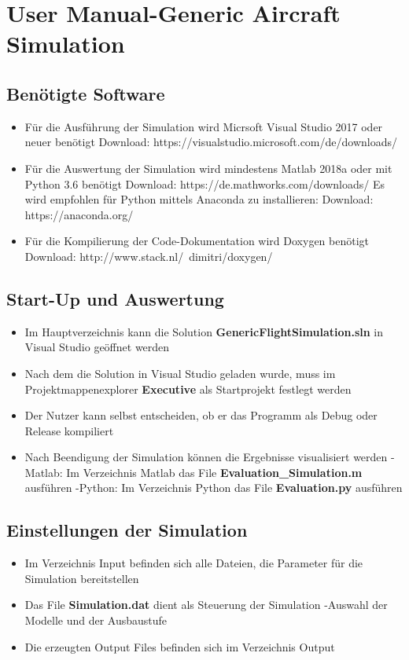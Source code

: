 \documentclass[
11pt,				%
a4paper,			%
DIV12,		     	%
liststotoc,			%
bibliography=totoc, %
listof=entryprefix, %
listot=entryprefix, %
appendixprefix=true,
pointlessnumbers,
	oneside,		%
]{scrbook}
\begin{document}
	
\chapter*{User Manual-Generic Aircraft Simulation}

\section{Benötigte Software}
\begin{itemize}
	\item Für die Ausführung der Simulation wird Micrsoft Visual Studio 2017 oder neuer benötigt
	\subitem Download: https://visualstudio.microsoft.com/de/downloads/
	\item  Für die Auswertung der Simulation wird mindestens Matlab 2018a oder  mit Python 3.6 benötigt
	\subitem Download: https://de.mathworks.com/downloads/
	\subitem Es wird empfohlen für Python mittels Anaconda zu installieren:
	\subitem Download: https://anaconda.org/
	\item Für die Kompilierung der Code-Dokumentation wird Doxygen benötigt
	\subitem Download: http://www.stack.nl/~dimitri/doxygen/
\end{itemize}
\section{Start-Up und Auswertung}
\begin{itemize}
	\item Im Hauptverzeichnis kann die Solution \textbf{GenericFlightSimulation.sln} in Visual Studio geöffnet werden
	\item Nach dem die Solution in Visual Studio geladen wurde, muss im Projektmappenexplorer \textbf{Executive} als Startprojekt festlegt werden
	\item Der Nutzer kann selbst entscheiden, ob er das Programm als Debug oder Release kompiliert
	\item Nach Beendigung der Simulation können die Ergebnisse visualisiert werden
	\subitem -Matlab: Im Verzeichnis Matlab das File \textbf{Evaluation\_Simulation.m} ausführen
	\subitem -Python: Im Verzeichnis Python das File \textbf{Evaluation.py} ausführen
\end{itemize}
\section{Einstellungen der Simulation}
\begin{itemize}
	\item Im Verzeichnis Input befinden sich alle Dateien, die Parameter für die Simulation bereitstellen
	\item Das File \textbf{Simulation.dat} dient als Steuerung der Simulation
	\subitem -Auswahl der Modelle und der Ausbaustufe
	\item Die erzeugten Output Files befinden sich im Verzeichnis Output
\end{itemize}
\end{document}
